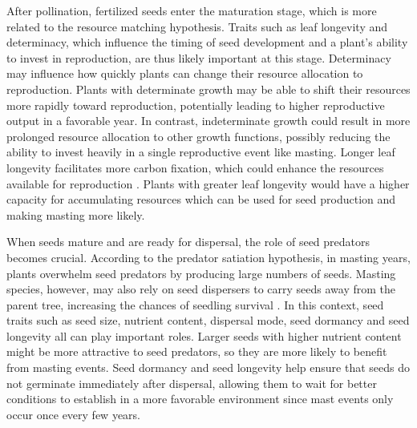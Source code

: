 \documentclass[11pt,letter]{article}
\begin{document}
After pollination, fertilized seeds enter the maturation stage, which is more related to the resource matching hypothesis. Traits such as leaf longevity and determinacy, which influence the timing of seed development and a plant's ability to invest in reproduction, are thus likely important at this stage. Determinacy \citep[whether the leaf material is prebuilt or not,][]{lechowicz1984temperate} may influence how quickly plants can change their resource allocation to reproduction. Plants with determinate growth may be able to shift their resources more rapidly toward reproduction, potentially leading to higher reproductive output in a favorable year. In contrast, indeterminate growth could result in more prolonged resource allocation to other growth functions, possibly reducing the ability to invest heavily in a single reproductive event like masting.  Longer leaf longevity facilitates more carbon fixation, which could enhance the resources available for reproduction \citep{adler2014functional}. Plants with greater leaf longevity would have a higher capacity for accumulating resources which can be used for seed production and making masting more likely.\par 

When seeds mature and are ready for dispersal, the role of seed predators becomes crucial. According to the predator satiation hypothesis, in masting years, plants overwhelm seed predators by producing large numbers of seeds. Masting species, however, may also rely on seed dispersers to carry seeds away from the parent tree, increasing the chances of seedling survival \citep{janzen1971seed, silvertown1980evolutionary}. In this context, seed traits such as seed size, nutrient content, dispersal mode, seed dormancy and seed longevity all can play important roles. Larger seeds with higher nutrient content might be more attractive to seed predators, so they are more likely to benefit from masting events. Seed dormancy and seed longevity help ensure that seeds do not germinate immediately after dispersal, allowing them to wait for better conditions to establish in a more favorable environment since mast events only occur once every few years.\par
\end{document}
